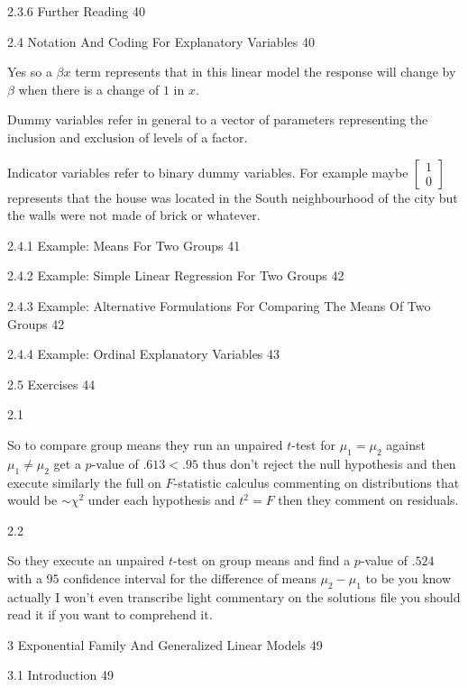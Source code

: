 2.3.6 Further Reading 40



2.4 Notation And Coding For Explanatory Variables 40

Yes so a $\beta x$ term represents that in this linear model the response will change by $\beta$ when there is a change of $1$ in $x$.

Dummy variables refer in general to a vector of parameters representing the inclusion and exclusion of levels of a factor.

Indicator variables refer to binary dummy variables. For example maybe $\begin{bmatrix} 1 \\ 0 \end{bmatrix}$ represents that the house was located in the South neighbourhood of the city but the walls were not made of brick or whatever.

2.4.1 Example: Means For Two Groups 41



2.4.2 Example: Simple Linear Regression For Two Groups 42



2.4.3 Example: Alternative Formulations For Comparing The Means Of Two Groups 42



2.4.4 Example: Ordinal Explanatory Variables 43



2.5 Exercises 44

2.1

So to compare group means they run an unpaired $t$-test for $\mu_1=\mu_2$ against $\mu_1 \neq \mu_2$ get a $p$-value of $.613 < .95$ thus don't reject the null hypothesis and then execute similarly the full on $F$-statistic calculus commenting on distributions that would be $\sim \chi^2$ under each hypothesis and $t^2=F$ then they comment on residuals.

2.2

So they execute an unpaired $t$-test on group means and find a $p$-value of $.524$ with a $95$ confidence interval for the difference of means $\mu_2-\mu_1$ to be you know actually I won't even transcribe light commentary on the solutions file you should read it if you want to comprehend it.

3 Exponential Family And Generalized Linear Models 49



3.1 Introduction 49



